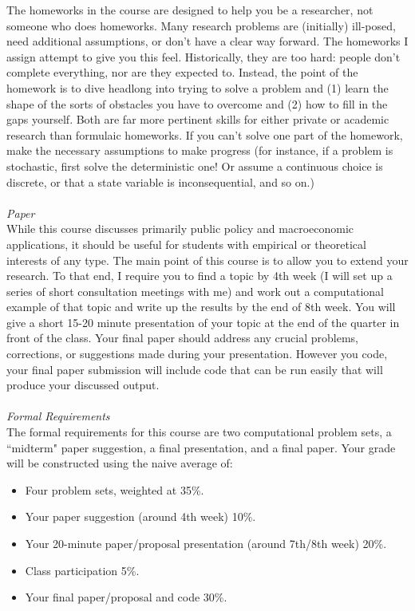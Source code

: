 \documentclass[a4paper]{article}
\begin{document}
The homeworks in the course are designed to help you be a researcher, not someone who does homeworks.  Many research problems are (initially) ill-posed, need additional assumptions, or don't have a clear way forward.  The homeworks I assign attempt to give you this feel.  Historically, they are too hard: people don't complete everything, nor are they expected to.  Instead, the point of the homework is to dive headlong into trying to solve a problem and (1) learn the shape of the sorts of obstacles you have to overcome and (2) how to fill in the gaps yourself. Both are far more pertinent skills for either private or academic research than formulaic homeworks. If you can't solve one part of the homework, make the necessary assumptions to make progress (for instance, if a problem is stochastic, first solve the deterministic one! Or assume a continuous choice is discrete, or that a state variable is inconsequential, and so on.)\\
\ \\

\emph{Paper}\\
While this course discusses primarily public policy and macroeconomic applications, it should be useful for students with empirical or theoretical interests of any type.   The main point of this course is to allow you to extend your research.  To that end, I require you to find a topic by 4th week (I will set up a series of short consultation meetings with me) and work out a  computational example of that topic and write up the results by the end of 8th week.  You will give a short 15-20 minute presentation of your topic at the end of the quarter in front of the class.  Your final paper should address any crucial problems, corrections, or suggestions made during your presentation.  However you code, your final paper submission will include  code that can be run easily that will produce your discussed output.  \\
\ \\

\emph{Formal Requirements}\\
The formal requirements for this course are two computational problem sets, a ``midterm" paper suggestion, a final presentation, and a final paper.  Your grade will be constructed using the naive average of: \begin{itemize}
\item Four problem sets, weighted at 35\%.
\item Your paper suggestion (around 4th week) 10\%.
\item Your 20-minute paper/proposal presentation (around 7th/8th week) 20\%.
\item Class participation 5\%.
\item Your final paper/proposal and code 30\%.
\end{itemize}
\ \\
\end{document}
